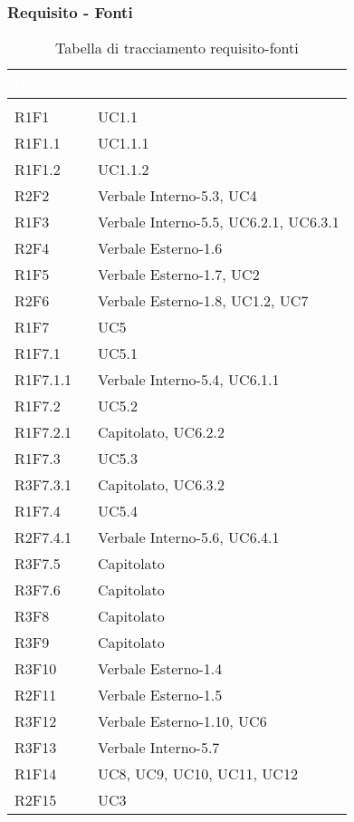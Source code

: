 \subsubsection{Requisito - Fonti}
\renewcommand{\arraystretch}{1.5}
\begin{center}
\begin{longtable}{C{6cm} C{6cm}}
		\textcolor{white}{\textbf{Requisito}} & 
		\textcolor{white}{\textbf{Fonti}}\\
		\endfirsthead
	    \\
	    \endfoot
	    \caption{Tabella di tracciamento requisito-fonti}
	    \endlastfoot


R1F1 & UC1.1 \\
R1F1.1 & UC1.1.1 \\
R1F1.2 & UC1.1.2 \\
R2F2 & Verbale Interno-5.3, UC4 \\
R1F3 & Verbale Interno-5.5, UC6.2.1, UC6.3.1 \\
R2F4 & Verbale Esterno-1.6 \\
R1F5 & Verbale Esterno-1.7, UC2 \\
R2F6 & Verbale Esterno-1.8, UC1.2, UC7 \\
R1F7 & UC5 \\
R1F7.1 & UC5.1 \\
R1F7.1.1 & Verbale Interno-5.4, UC6.1.1 \\
R1F7.2 & UC5.2 \\
R1F7.2.1 & Capitolato, UC6.2.2 \\
R1F7.3 & UC5.3 \\
R3F7.3.1 & Capitolato, UC6.3.2 \\
R1F7.4 & UC5.4 \\
R2F7.4.1 & Verbale Interno-5.6, UC6.4.1 \\
R3F7.5 & Capitolato \\
R3F7.6 & Capitolato \\
R3F8 & Capitolato \\
R3F9 & Capitolato \\
R3F10 & Verbale Esterno-1.4 \\
R2F11 & Verbale Esterno-1.5 \\
R3F12 & Verbale Esterno-1.10, UC6 \\
R3F13 & Verbale Interno-5.7 \\
R1F14 & UC8, UC9, UC10, UC11, UC12 \\
R2F15 & UC3\\


\end{longtable}
\end{center}
